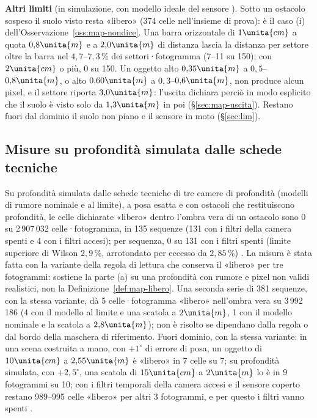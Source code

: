 \textbf{Altri limiti} (in simulazione, con modello ideale del sensore ). Sotto un ostacolo sospeso il suolo visto resta «libero» (374 celle nell'insieme di prova): è il caso (i) dell'Osservazione~\ref{oss:map-nondice}. Una barra orizzontale di $1\unita{cm}$ a quota $0{,}8\unita{m}$ e a $2{,}0\unita{m}$ di distanza lascia la distanza per settore oltre la barra nel $4{,}7$–$7{,}3\,\%$ dei settori·fotogramma (7–11 su 150); con $2\unita{cm}$ o più, 0 su 150. Un oggetto alto $0{,}35\unita{m}$ a $0{,}5$–$0{,}8\unita{m}$, o alto $0{,}60\unita{m}$ a $0{,}3$–$0{,}6\unita{m}$, non produce alcun pixel, e il settore riporta $3{,}0\unita{m}$: l'uscita dichiara perciò in modo esplicito che il suolo è visto solo da $1{,}3\unita{m}$ in poi (\S\ref{sec:map-uscita}). Restano fuori dal dominio il suolo non piano e il sensore in moto (\S\ref{sec:lim}).

\subsection{Misure su profondità simulata dalle schede tecniche}\label{sec:map-schede}

Su profondità simulata dalle schede tecniche di tre camere di profondità (modelli di rumore nominale e al limite), a posa esatta e con ostacoli che restituiscono profondità, le celle dichiarate «libero» dentro l'ombra vera di un ostacolo sono 0 su 2\,907\,032 celle·fotogramma, in 135 sequenze (131 con i filtri della camera spenti e 4 con i filtri accesi); per sequenza, 0 su 131 con i filtri spenti (limite superiore di Wilson $2{,}9\,\%$, arrotondato per eccesso da $2{,}85\,\%$) . La misura è stata fatta con la variante della regola di lettura che conserva il «libero» per tre fotogrammi: sostiene la parte (a) su una profondità con rumore e pixel non validi realistici, non la Definizione~\ref{def:map-libero}. Una seconda serie di 381 sequenze, con la stessa variante, dà 5 celle·fotogramma «libero» nell'ombra vera su 3\,992\,186 (4 con il modello al limite e una scatola a $2\unita{m}$, 1 con il modello nominale e la scatola a $2{,}8\unita{m}$); non è risolto se dipendano dalla regola o dal bordo della maschera di riferimento. Fuori dominio, con la stessa variante: in una scena costruita a mano, con $+1^\circ$ di errore di posa, un oggetto di $10\unita{cm}$ a $2{,}55\unita{m}$ è «libero» in 7 celle su 7; su profondità simulata, con $+2{,}5^\circ$, una scatola di $15\unita{cm}$ a $2\unita{m}$ lo è in 9 fotogrammi su 10; con i filtri temporali della camera accesi e il sensore coperto restano 989–995 celle «libero» per altri 3 fotogrammi, e per questo i filtri vanno spenti .

